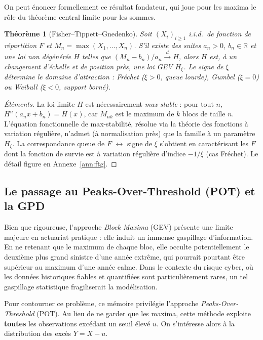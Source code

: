 \documentclass[11pt,a4paper]{article}
\theoremstyle{navystyle}
\newtheorem{theorem}{Théorème}[section]
\theoremstyle{navydef}
\newcommand{\R}{\mathbb{R}}
\begin{document}
\noindent On peut énoncer formellement ce résultat fondateur, qui joue pour les maxima le rôle du théorème central limite pour les sommes.

\begin{theorem}[Fisher--Tippett--Gnedenko]\label{th:ftg}
Soit $(X_i)_{i\ge1}$ i.i.d.\ de fonction de répartition $F$ et $M_n=\max(X_1,\dots,X_n)$. S'il existe des suites $a_n>0$, $b_n\in\R$ et une loi non dégénérée $H$ telles que $(M_n-b_n)/a_n \xrightarrow{d} H$, alors $H$ est, à un changement d'échelle et de position près, une loi GEV $H_\xi$. Le signe de $\xi$ détermine le domaine d'attraction : Fréchet ($\xi>0$, queue lourde), Gumbel ($\xi=0$) ou Weibull ($\xi<0$, support borné).
\end{theorem}

\begin{proof}[Éléments]
La loi limite $H$ est nécessairement \emph{max-stable} : pour tout $n$, $H^n(a_nx+b_n)=H(x)$, car $M_{nk}$ est le maximum de $k$ blocs de taille $n$. L'équation fonctionnelle de max-stabilité, résolue via la théorie des fonctions à variation régulière, n'admet (à normalisation près) que la famille à un paramètre $H_\xi$. La correspondance queue de $F$ $\leftrightarrow$ signe de $\xi$ s'obtient en caractérisant les $F$ dont la fonction de survie est à variation régulière d'indice $-1/\xi$ (cas Fréchet). Le détail figure en Annexe~\ref{ann:ftg}.
\end{proof}

\subsection{Le passage au Peaks-Over-Threshold (POT) et la GPD}

Bien que rigoureuse, l'approche \textit{Block Maxima} (GEV) présente une limite majeure en actuariat pratique : elle induit un immense gaspillage d'information. En ne retenant que le maximum de chaque bloc, elle occulte potentiellement le deuxième plus grand sinistre d'une année extrême, qui pourrait pourtant être supérieur au maximum d'une année calme. Dans le contexte du risque cyber, où les données historiques fiables et quantifiées sont particulièrement rares, un tel gaspillage statistique fragiliserait la modélisation.

Pour contourner ce problème, ce mémoire privilégie l'approche \textit{Peaks-Over-Threshold} (POT). Au lieu de ne garder que les maxima, cette méthode exploite \textbf{toutes} les observations excédant un seuil élevé $u$. On s'intéresse alors à la distribution des excès $Y = X - u$.
\end{document}

